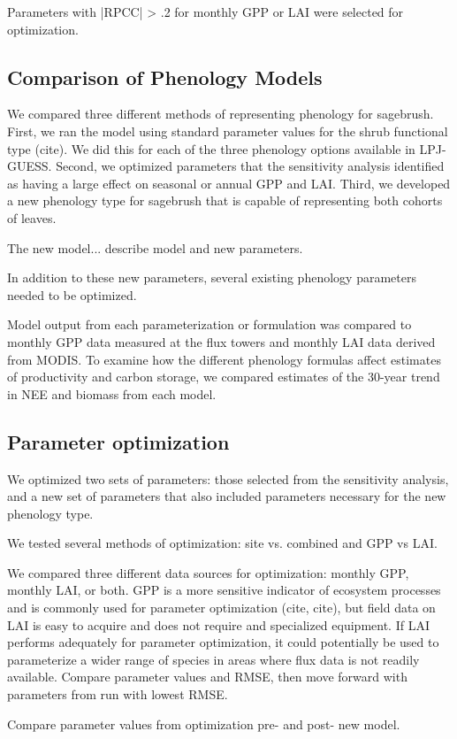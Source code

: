 \documentclass[]{article}
\begin{document}
Parameters with |RPCC| > .2 for monthly GPP or LAI were selected for optimization.
\subsection{Comparison of Phenology Models}
We compared three different methods of representing phenology for sagebrush. First, we ran the model using standard parameter values for the shrub functional type (cite). We did this for each of the three phenology options available in LPJ-GUESS. Second, we optimized parameters that the sensitivity analysis identified as having a large effect on seasonal or annual GPP and LAI. Third, we developed a new phenology type for sagebrush that is capable of representing both cohorts of leaves.

The new model... describe model and new parameters.

In addition to these new parameters, several existing phenology parameters needed to be optimized.

Model output from each parameterization or formulation was compared to monthly GPP data measured at the flux towers and monthly LAI data derived from MODIS. To examine how the different phenology formulas affect estimates of productivity and carbon storage, we compared estimates of the 30-year trend in NEE and biomass from each model.

\subsection{Parameter optimization}
We optimized two sets of parameters: those selected from the sensitivity analysis, and a new set of parameters that also included parameters necessary for the new phenology type.

We tested several methods of optimization: site vs. combined and GPP vs LAI.

We compared three different data sources for optimization: monthly GPP, monthly LAI, or both. GPP is a more sensitive indicator of ecosystem processes and is commonly used for parameter optimization (cite, cite), but field data on LAI is easy to acquire and does not require and specialized equipment. If LAI performs adequately for parameter optimization, it could potentially be used to parameterize a wider range of species in areas where flux data is not readily available. Compare parameter values and RMSE, then move forward with parameters from run with lowest RMSE.


Compare parameter values from optimization pre- and post- new model.
\end{document}
